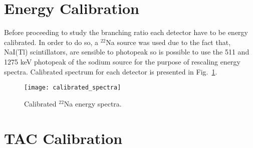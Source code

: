 \section*{Energy Calibration}

Before proceeding to study the branching ratio each detector have to be energy calibrated. In order to do so, a $^{22}$Na source was used due to the fact that, NaI(Tl) scintillators, are sensible to photopeak so is possible to use the 511 and  1275 keV photopeak of the sodium source for the purpose of rescaling energy spectra. Calibrated spectrum for each detector is presented in Fig.~\ref{Fig: calibrated spectra}.

\begin{figure}[H]
\centering
\texttt{[image: calibrated\_spectra]}
\caption{Calibrated $^{22}$Na energy spectra.}
\label{Fig: calibrated spectra}
\end{figure}


\section*{TAC Calibration}

